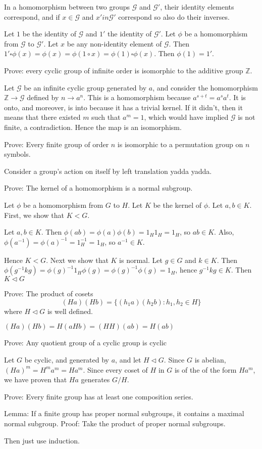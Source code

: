 \exercise
In a homomorphism between two groups $\mathcal{G}$ and $\mathcal{G}'$, their identity elements correspond, and if $x \in \mathcal{G}$ and $x' in \mathcal{G}'$ correspond so also do their inverses.

\answer
Let $1$ be the identity of $\mathcal{G}$ and $1'$ the identity of $\mathcal{G}'$. Let $\phi$ be a homomorphism from $\mathcal{G}$ to $\mathcal{G}'$. Let $x$ be any non-identity element of $\mathcal{G}$. Then $1' \square \phi(x) = \phi(x) = \phi(1 \circ x) = \phi(1) \square \phi(x)$. Then $\phi(1) = 1'$.

\exercise
Prove: every cyclic group of infinite order is isomorphic to the additive group $\mathbb{Z}$.

\answer
Let $\mathcal{G}$ be an infinite cyclic group generated by $a$, and consider the homomorphism $\mathbb{Z} \to \mathcal{G}$ defined by $n \to a^n$. This is a homomorphism because $a^{s+t} = a^s a^t$. It is onto, and moreover, is into because it has a trivial kernel. If it didn't, then it means that there existed $m$ such that $a^m = 1$, which would have implied $\mathcal{G}$ is not finite, a contradiction. Hence the map is an isomorphism.


\exercise
Prove: Every finite group of order $n$ is isomorphic to a permutation group on $n$ symbols.

\answer
Consider a group's action on itself by left translation yadda yadda.


\exercise
Prove: The kernel of a homomorphism is a normal subgroup.

\answer
Let $\phi$ be a homomorphism from $G$ to $H$. Let $K$ be the kernel of $\phi$. Let $a, b \in K$. First, we show that $K < G$.

Let $a, b \in K$. Then $\phi(ab) = \phi(a)\phi(b) = 1_H 1_H = 1_H$, so $ab \in K$. Also, $\phi(a^{-1}) = \phi(a)^{-1} = 1_H^{-1} = 1_H$, so $a^{-1} \in K$. 

Hence $K < G$. Next we show that $K$ is normal. Let $g \in G$ and $k \in K$. Then $\phi(g^{-1}kg) = \phi(g)^{-1} 1_H \phi(g) = \phi(g)^{-1} \phi(g) = 1_H$, hence $g^{-1}kg \in K$. Then $K \triangleleft G$


\exercise
Prove: The product of cosets 
\[(Ha)(Hb) = \{(h_1a)(h_2b): h_1,h_2 \in H\}\]
where $H \triangleleft G$ is well defined.

\answer
$(Ha)(Hb) = H(aHb) = (HH)(ab) = H(ab)$


\exercise
Prove: Any quotient group of a cyclic group is cyclic

\answer
Let $G$ be cyclic, and generated by $a$, and let $H \triangleleft G$. Since $G$ is abelian, $(Ha)^m = H^m a^m = Ha^m$. Since every coset of $H$ in $G$ is of the of the form $Ha^m$, we have proven that $Ha$ generates $G/H$.


\exercise
Prove: Every finite group has at least one composition series.

\answer
Lemma: If a finite group has proper normal subgroups, it contains a maximal normal subgroup. Proof: Take the product of proper normal subgroups.

Then just use induction.

\exercise


\answer
